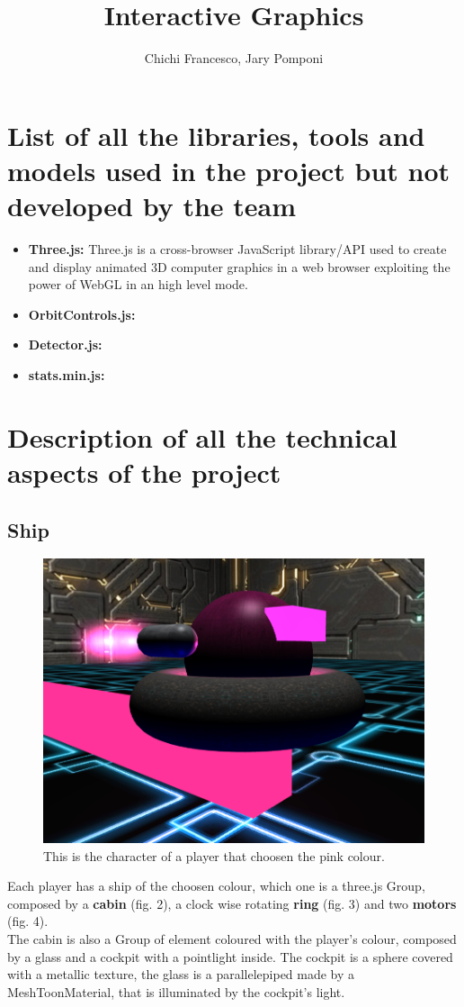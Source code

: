 \documentclass[11pt]{article}
\title{Interactive Graphics}
\author{Chichi Francesco, Jary Pomponi}
\begin{document}
\maketitle
\graphicspath{{img/}}

\section{List of all the libraries, tools and models used in the project but	not developed by the team}
\begin{itemize}
	\item \textbf{Three.js:}
		Three.js is a cross-browser JavaScript library/API used to create and display animated 3D computer graphics in a web browser exploiting the power of WebGL in an high level mode.
	\item \textbf{OrbitControls.js:}
	\item \textbf{Detector.js:}
	\item \textbf{stats.min.js:}
\end{itemize}
\section{Description of all the technical aspects of the project}
\subsection{Ship}
	
	
	\begin{figure}
		\centering
		\includegraphics[width=0.4\linewidth]{ship}
		\caption{This is the character of a player that choosen the pink colour.}
		\label{fig:ship}
	\end{figure}
	
	Each player has a ship of the choosen colour, which one is a three.js Group, composed by a \textbf{cabin} (fig. 2), a clock wise rotating \textbf{ring} (fig. 3) and two \textbf{motors} (fig. 4).\\
	
	The cabin is also a Group of element coloured with the player's colour, composed by a glass and a cockpit with a pointlight inside.
	The cockpit is a sphere covered with a metallic texture, the glass is a parallelepiped made by a MeshToonMaterial, that is illuminated by the cockpit's light.\\
	
\end{document}
